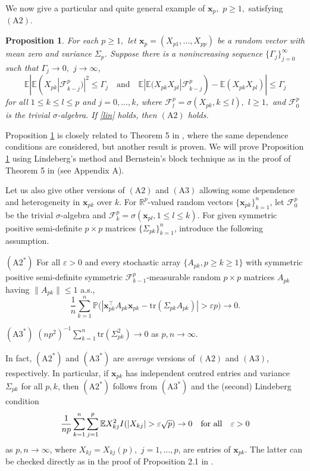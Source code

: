 \documentclass[12pt, a4paper]{article}
\newcommand\x{\mathbf x}
\newcommand\bR{{\mathbb R}}
\newcommand\e{{\mathbb E}}
\newcommand\p{{\mathbb P}}
\newcommand\tr{{\mathrm{tr}}}
\newcommand\cF{{\mathcal F}}
\newtheorem{proposition}[theorem]{Proposition}%
\begin{document}
We now give a particular and quite general example of $\x_p,$ $p\geqslant 1,$ satisfying $(\mathrm A2)$.
\begin{proposition}\label{p3}
For each $p\geqslant 1,$ let $\x_p=(X_{p1},\ldots,X_{pp})$ be a random vector with mean zero and variance $\Sigma_p$. Suppose there is a nonincreasing sequence $\{\Gamma_j\}_{j=0}^\infty$ such that  $\Gamma_j\to0, $  $j\to\infty$, 
\[\e|\e(X_{pk}|\cF_{k-j}^p)|^2\leqslant \Gamma_j\quad \text{and}\quad \e|\e(X_{pk}X_{pl}|\cF_{k-j}^p)-\e(X_{pk}X_{pl})|\leqslant \Gamma_j\]
for all $1\leqslant k\leqslant l\leqslant p$ and $j=0,\ldots,k$, where $\cF_l^p=\sigma(X_{pk},k\leqslant l),$ $l\geqslant 1,$  and $\cF_0^p$ is the trivial $\sigma$-algebra. If \eqref{lin} holds, then $(\mathrm A2)$ holds. 
\end{proposition} 

 Proposition \ref{p3} is closely related to Theorem 5 in \cite{PM}, where the same dependence conditions are considered, but another result is proven. We will prove Proposition \ref{p3} using Lindeberg's method and Bernstein's block technique as in the proof of Theorem 5 in \cite{PM} (see Appendix A). 
 
 
Let us also give other versions of $(\text{A2})$ and $(\text{A3})$  allowing some dependence and heterogeneity in $\x_{pk}$ over $k$.  For $\bR^p$-valued random vectors $\{\x_{pk}\}_{k=1}^n$, let $\cF_0^p$ be the trivial $\sigma$-algebra and $\cF_{k}^p=\sigma(\x_{pl},1\leqslant l\leqslant k)$. For given symmetric positive  semi-definite $p\times p$ matrices $\{\Sigma_{pk}\}_{k=1}^n$, introduce the following assumption.

$(\mathrm A2^*)$  For all $\varepsilon>0$ and every stochastic array $\{A_{pk},p\geqslant k\geqslant  1\}$ with symmetric positive semi-definite symmetric $\cF_{k-1}^p$-measurable random $p\times p$ matrices  $A_{pk}$ having $\|A_{pk}\|\leqslant 1$ a.s.,
\[\frac{1}{n}\sum_{k=1}^n\p\big(|\x_{pk}^\top A_{pk}\x_{pk}-\tr(\Sigma_{pk}A_{pk})|>\varepsilon p\big)\to0.\]

$(\mathrm A3^*)$   $(np^2)^{-1}\sum_{k=1}^n\tr(\Sigma_{pk}^2)\to 0$ as $p,n\to\infty$. 


In fact, $(\mathrm A2^*)$ and $(\mathrm A3^*)$ are  {\it average} versions of $(\mathrm A2)$ and $(\mathrm A3)$, respectively. In particular, if  $\x_{pk}$ has independent centred entries and variance $\Sigma_{pk}$ for all $p,k$,  then $(\mathrm A2^*)$ follows from   $(\mathrm A3^*)$ and the (second) Lindeberg condition
\begin{equation*}\label{lin2}
\frac{1}{np}\sum_{k=1}^n\sum_{j=1}^p\e X_{kj}^2 I(|X_{kj}|>\varepsilon \sqrt{p})\to 0\quad\text{for all\quad}\varepsilon>0
\end{equation*} 
as $p,n\to\infty$, where $X_{kj}=X_{kj}(p),$ $j=1,\ldots,p$, are entries of $\x_{pk}$. The latter can be checked directly as  in the proof of Proposition 2.1 in \cite{Y1}.
\end{document}
